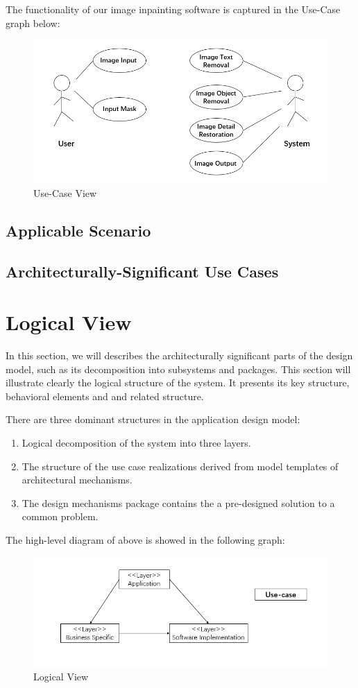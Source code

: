 \documentclass[12pt]{article}
\begin{document}
The functionality of our image inpainting software is captured in the Use-Case graph below:
\begin{figure}[H]
	\centering
	\includegraphics[width=1.0\linewidth]{use-case.jpg}
	\caption{Use-Case View}
\end{figure}

\subsection{Applicable Scenario}
\subsection{Architecturally-Significant Use Cases}

\section{Logical View}
\qquad In this section, we will describes the architecturally significant parts of the design model, such as its decomposition into subsystems and packages. This section will illustrate clearly the logical structure of the system. It presents its key structure, behavioral elements and and related structure.

There are three dominant structures in the application design model:
\begin{enumerate}
	\item Logical decomposition of the system into three layers.
	\item The structure of the use case realizations derived from model templates of architectural mechanisms.
	\item The design mechanisms package contains the a pre-designed solution to a common problem. 
\end{enumerate}

The high-level diagram of above is showed in the following graph:
\begin{figure}[H]
	\centering
	\includegraphics[width=1.0\linewidth]{logical.jpg}
	\caption{Logical View}
\end{figure}
\end{document}

